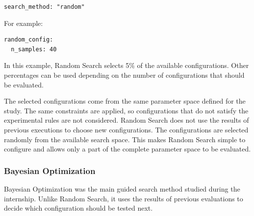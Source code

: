 \begin{verbatim}
search_method: "random"
\end{verbatim}

 For example:

\begin{verbatim}
random_config:
  n_samples: 40
\end{verbatim}


\begin{cut}
In this example, Random Search selects 5\% of the available
configurations. Other percentages can be used depending on the number of
configurations that should be evaluated.
\end{cut}

The selected configurations come from the same parameter space defined
for the study. The same constraints are applied, so configurations that
do not satisfy the experimental rules are not considered.
Random Search does not use the results of previous executions to choose
new configurations. The configurations are selected randomly from the
available search space.
This makes Random Search simple to configure and allows only a part of
the complete parameter space to be evaluated. 


\subsubsection{Bayesian Optimization}
\label{sec:bayesian-search}

Bayesian Optimization was the main guided search method studied during
the internship. Unlike Random Search, it uses the results of previous
evaluations to decide which configuration should be tested next.

